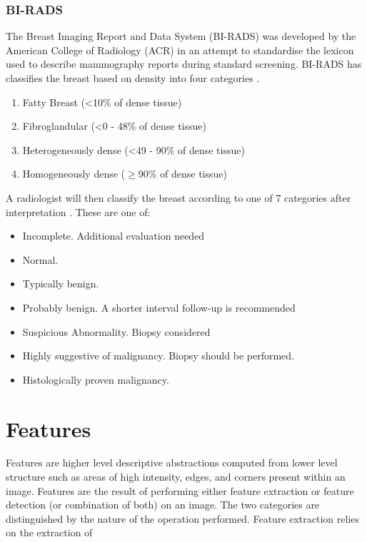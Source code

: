 \subsubsection{BI-RADS}
The Breast Imaging Report and Data System (BI-RADS) \cite{d1998illustrated, balleyguier2007birads} was developed by the American College of Radiology (ACR) in an attempt to standardise the lexicon used to describe mammography reports during standard screening. BI-RADS has classifies the breast based on density into four categories \cite{balleyguier2007birads}.

\begin{enumerate}
	\item Fatty Breast (\textless10\% of dense tissue)
	\item Fibroglandular (\textless 0 - 48\% of dense tissue)
	\item Heterogeneously dense (\textless49 - 90\% of dense tissue)
	\item Homogeneously dense ($\geq$90\% of dense tissue)
\end{enumerate}

A radiologist will then classify the breast according to one of 7 categories after interpretation \cite{balleyguier2007birads}. These are one of:

\begin{itemize}
	\item Incomplete. Additional evaluation needed
	\item Normal. 
	\item Typically benign.
	\item Probably benign. A shorter interval follow-up is recommended
	\item Suspicious Abnormality. Biopsy considered
	\item Highly suggestive of malignancy. Biopsy should be performed.
	\item Histologically proven malignancy.
\end{itemize}


\section{Features}
Features are higher level descriptive abstractions computed from lower level structure such as areas of high intensity, edges, and corners present within an image. Features are the result of performing either feature extraction or feature detection (or combination of both) on an image. The two categories are distinguished by the nature of the operation performed. Feature extraction relies on the  extraction of 
